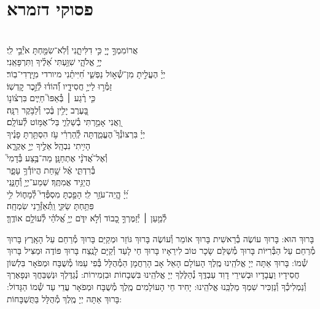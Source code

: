 \documentclass[twoside, openany, parskip=half, 11pt]{book}
\begin{document}
\section[פסוקי דזמרא]{ פסוקי דזמרא }
  \\
אֲרוֹמִמְךָ֣ יְיָ֭ כִּ֣י דִלִּיתָ֑נִי \hfill וְ֯לֹֽא־שִׂמַּ֖חְתָּ אֹיְ֯בַ֣י לִֽי׃\\
יְיָ֥ אֱלֹהָ֑י \hfill שִׁוַּ֥עְתִּי אֵ֝לֶ֗יךָ וַתִּרְפָּאֵֽנִי׃\\
יְיָ֗ הֶעֱלִ֣יתָ מִן־שְׁ֯א֣וֹל נַפְשִׁ֑י \hfill חִ֝יִּיתַ֗נִי מיורדי מִיׇּֽרְדִי־בֽוֹר׃\\
זַמְּ֯ר֣וּ לַייָ֣ חֲסִידָ֑יו \hfill וְ֯֝הוֹד֗וּ לְ֯זֵ֣כֶר קׇדְשֽׁוֹ׃\\
כִּ֤י רֶ֨גַע ׀ בְּ֯אַפּוֹ֮ \hfill חַיִּ֢ים בִּרְצ֫וֹנ֥וֹ\\
בָּ֭עֶרֶב יָלִ֥ין בֶּ֗כִי \hfill וְ֯לַבֹּ֥קֶר רִנָּֽה׃\\
וַ֭אֲנִי אָמַ֣רְתִּי בְ֯שַׁלְוִ֑י \hfill בַּל־אֶמּ֥וֹט לְ֯עוֹלָֽם׃\\
יְיָ֗ בִּרְצוֹנְ֯ךָ֮ הֶעֱמַ֢דְתָּה לְֽ֯הַרְרִ֫י עֹ֥ז \hfill הִסְתַּ֥רְתָּ פָנֶ֗יךָ\\
הָיִ֥יתִי נִבְהָֽל׃ \hfill אֵלֶ֣יךָ יְיָ֣ אֶקְרָ֑א \\
וְ֯אֶל־אֲ֝דֹנָ֗י אֶתְחַנָּֽן׃ \hfill מַה־בֶּ֥צַע בְּ֯דָמִי֮\\
בְּ֯רִדְתִּ֢י אֶ֫ל שָׁ֥חַת \hfill הֲיוֹדְ֯ךָ֥ עָפָ֑ר\\
הֲיַגִּ֥יד אֲמִתֶּֽךָ׃ \hfill שְׁמַע־יְיָ֥ וְ֯חׇנֵּ֑נִי\\
יְ֝יָ֗ הֱֽיֵה־עֹזֵ֥ר לִֽי׃ \hfill הָפַ֣כְתָּ מִסְפְּ֯דִי֮ לְ֯מָח֢וֹל לִ֥י\\
פִּתַּ֥חְתָּ שַׂקִּ֑י \hfill וַֽתְּ֯אַזְּ֯רֵ֥נִי שִׂמְחָֽה׃\\
לְ֯מַ֤עַן ׀ יְ֯זַמֶּרְךָ֣ כָ֭בוֹד וְ֯לֹ֣א יִדֹּ֑ם \hfill יְיָ֥ אֱ֝לֹהַ֗י לְ֯עוֹלָ֥ם אוֹדֶֽךָּ׃ \\
\mournerskaddish


בָּרוּךְ הוּא:
בָּרוּךְ עוֹשֶׂה בְ֯רֵאשִׁית בָּרוּךְ אוֹמֵר וְ֯עוֹשֶׂה
בָּרוּךְ גּוֹזֵר וּמְקַיֵּם בָּרוּךְ מְ֯רַחֵם עַל הָאָֽרֶץ
בָּרוּךְ מְ֯רַחֵם עַל הַבְּ֯רִיּוֹת בָּרוּךְ מְ֯שַׁלֵּם שָׂכָר טוֹב לִירֵאָיו
בָּרוּךְ חַי לָעַד וְ֯קַיָּם לָנֶֽצַח בָּרוּךְ פּוֹדֶה וּמַצִּיל בָּרוּךְ שְׁ֯מוֹ:
בָּרוּךְ אַתָּה יְיָ אֱלֹהֵֽינוּ מֶֽלֶךְ הָעוֹלָם הָאֵל אָב הָרַחֲמָן הַמְ֯הֻלָּל בְּ֯פִי עַמּוֹ מְ֯שֻׁבָּח וּמְפֹאָר בִּלְשׁוֹן חֲסִידָיו וַעֲבָדָיו וּבְשִׁירֵי דָוִד עַבְדֶּֽךָ נְ֯הַלֶּלְךָ יְיָ אֱלֹהֵֽינוּ בִּשְׁבָחוֹת וּבִזְמִירוֹת: נְ֯גַדֶּלְךָ וּנְשַׁבֵּחֲךָ וּנְפָאֶרְךָ וְ֯נַמְלִיכְ֯ךָ וְ֯נַזְכִּיר שִׁמְךָ מַלְכֵּֽנוּ אֱלֹהֵֽינוּ:
 יָחִיד חֵי הָעוֹלָמִים מֶֽלֶךְ מְ֯שֻׁבָּח וּמְפֹאָר עֲדֵי עַד שְׁ֯מוֹ הַגָּדוֹל: בָּרוּךְ אַתָּה יְיָ מֶֽלֶךְ מְ֯הֻלָּל בַּתֻּשְׁבָּחוֹת:
\end{document}
